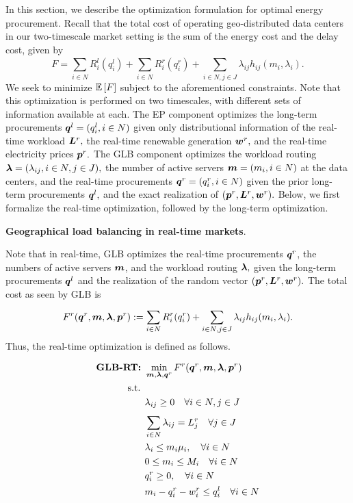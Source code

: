 In this section, we describe the optimization formulation for optimal energy procurement. Recall that the total cost of operating geo-distributed data centers in our two-timescale market setting is the sum of the energy cost and the delay cost, given by $$F = \sum_{i\in N}^{} R^l_i(q^l_i) + \sum_{i \in N}^{} R_i^r(q^r_i)+ \sum_{i \in N,j \in J} \lambda_{ij}h_{ij}(m_i,\lambda_i).$$
We seek to minimize $\mathbb{E}\left[F\right]$ subject to the aforementioned constraints. Note that this optimization is performed on two timescales, with different sets of information available at each. The EP component optimizes the long-term procurements $\boldsymbol{q}^l = (q^l_i, i\in N)$ given only distributional information of the real-time workload $\boldsymbol{L}^r,$
the real-time renewable generation $\boldsymbol{w}^r,$ and the real-time electricity prices $\boldsymbol{p}^r.$ The GLB component optimizes the workload routing $\boldsymbol{\lambda} = (\lambda_{ij},i\in N,j \in J),$ the number of active servers $\boldsymbol{m} = (m_i,i \in N)$ at the data centers, and the real-time procurements $\boldsymbol{q}^r = (q^r_i,i \in
N)$ given the prior long-term procurements $\boldsymbol{q}^l,$ and the exact realization of $(\boldsymbol{p}^r,\boldsymbol{L}^r,\boldsymbol{w}^r).$
Below, we first formalize the real-time optimization, followed by the long-term optimization.

\textbf{Geographical load balancing in real-time markets}. 

Note that in real-time, GLB optimizes the real-time procurements
$\boldsymbol{q}^r$, the numbers of active servers $\boldsymbol{m}$, and the workload routing $\boldsymbol{\lambda},$ given the long-term procurements $\boldsymbol{q}^l$ and the realization of the random vector $(\boldsymbol{p}^r,\boldsymbol{L}^r,\boldsymbol{w}^r).$ The total cost as seen by GLB is $$F^r(\boldsymbol{q}^r, \boldsymbol{m},\boldsymbol{\lambda},\boldsymbol{p}^r)
:= \sum_{i \in N}^{} R_i^r(q^r_i)+ \sum_{i\in N, j \in J}
\lambda_{ij}h_{ij}(m_i,\lambda_i).$$ Thus, the real-time optimization is defined as follows.

\vspace{0.1in}
\begin{subequations}
	\begin{align}
	\text{\bf{GLB-RT}: } &  \min_{\boldsymbol{m}, \boldsymbol{\lambda}, \boldsymbol{q}^r} F^r(\boldsymbol{q}^r, \boldsymbol{m},\boldsymbol{\lambda},\boldsymbol{p}^r) \nonumber \\
	\mbox{s.t. } \nonumber \\
	\label{eq:GLB-RT_c1}
	&\lambda_{ij} \geq 0  \quad \forall i \in N,j \in J \\
	&\sum_{i\in N}^{} \lambda_{ij} = L^r_j \quad \forall j \in J \\
	\label{eq:GLB-RT_c}
	&\lambda_i \leq m_i \mu_i,   \quad \forall i \in N\\
	&0 \leq m_i \leq M_i \quad \forall i \in N \\
	\label{eq:GLB-RT_c2}
	&q^r_i \geq 0, \quad \forall i \in N \\
	\label{eq:GLB-RT_c3}
	& m_i - q^r_i - w^r_i \leq q^l_i \quad \forall i \in N
	\end{align}
\end{subequations}
\vspace{0.1in}

